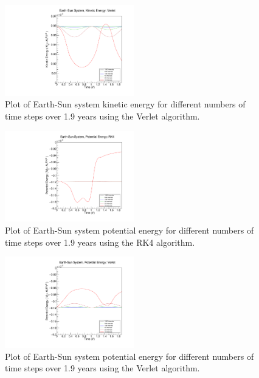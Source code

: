 \documentclass[a4paper,12pt]{report}
\begin{document}
   \begin{figure}[H]
 \centering
   \includegraphics[width=0.5\textwidth]{ESVerlet_ke.pdf}
  \caption{Plot of Earth-Sun system kinetic energy for different numbers of time steps over 1.9 years using the Verlet algorithm.}
  \label{fig:ESVerlet_ke}
 \end{figure}


\begin{figure}[H]
 \centering
   \includegraphics[width=0.5\textwidth]{ESRK4_pe.pdf}
  \caption{Plot of Earth-Sun system potential energy for different numbers of time steps over 1.9 years using the RK4 algorithm.}
  \label{fig:ESRK4_pe}
 \end{figure}

 \begin{figure}[H]
 \centering
   \includegraphics[width=0.5\textwidth]{ESVerlet_pe.pdf}
  \caption{Plot of Earth-Sun system potential energy for different numbers of time steps over 1.9 years using the Verlet algorithm.}
  \label{fig:ESVerlet_pe}
 \end{figure}
\end{document}
